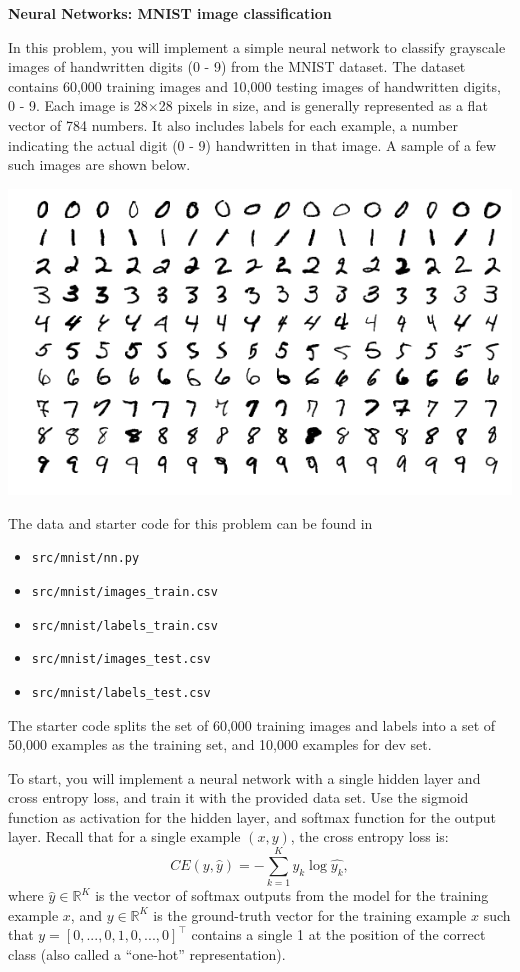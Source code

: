 \item {} {\bf Neural Networks: MNIST image classification}

In this problem, you will implement a simple neural network
to classify grayscale images of handwritten digits (0 - 9) from
the MNIST dataset. The dataset contains 60,000 training images and
10,000 testing images of handwritten digits, 0 - 9. Each image is
28$\times$28 pixels in size, and is generally represented as a flat
vector of 784 numbers. It also includes labels for each example, a number
indicating the actual digit (0 - 9) handwritten in that image. A sample of
a few such images are shown below.

\begin{center}
\includegraphics[scale=0.5]{mnist/mnist_plot}
\end{center}


The data and starter code for this problem can be found in

\begin{itemize}
\item \texttt{src/mnist/nn.py}
\item \texttt{src/mnist/images\_train.csv}
\item \texttt{src/mnist/labels\_train.csv}
\item \texttt{src/mnist/images\_test.csv}
\item \texttt{src/mnist/labels\_test.csv}
\end{itemize}

The starter code splits the set
of 60,000 training images and labels into a set of 50,000 examples as
the training set, and 10,000 examples for dev set.

To start, you will implement a neural network with a single hidden layer
and cross entropy loss, and train it with the provided data set. Use the
sigmoid function as activation for the hidden layer, and softmax function
for the output layer. Recall that for a single example $(x, y)$, the cross
entropy loss is:
$$CE(y, \hat{y}) = - \sum_{k=1}^K y_k \log \hat{y_k},$$
where $\hat{y} \in \mathbb{R}^{K}$ is the vector of softmax outputs
from the model for the training example $x$,
and $y \in \mathbb{R}^{K}$ is the ground-truth vector for the training example
$x$ such that $y = [0,...,0,1,0,...,0]^\top$ contains a single 1 at the
position of the correct class (also called a ``one-hot'' representation).

